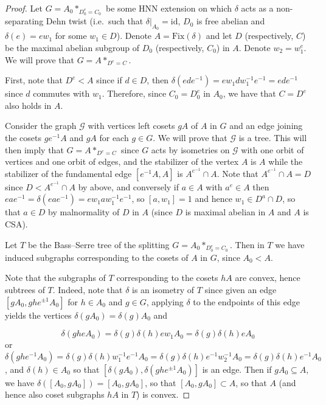 \documentclass{amsart}
\theoremstyle{plain}
\theoremstyle{definition}
\theoremstyle{remark}
\begin{document}
\begin{proof}
    Let $G = {A_0}*_{D_0^e=C_0}$ be some HNN extension on which $\delta$ acts as a non-separating Dehn twist (i.e.\ such that $\delta\vert_{A_0} = \mathrm{id}$, $D_0$ is free abelian and $\delta(e) = ew_1$ for some $w_1 \in D$). Denote $A = \mathrm{Fix}(\delta)$ and let $D$ (respectively, $C$) be the maximal abelian subgroup of $D_0$ (respectively, $C_0$) in $A$. Denote $w_2 = w_1^e$. We will prove that $G = A*_{D^e=C}$.

    First, note that $D^e < A$ since if $d \in D$, then $\delta(ede^{-1}) = ew_1 d w_1^{-1}e^{-1} = ede^{-1}$ since $d$ commutes with $w_1$. Therefore, since $C_0 = D_0^e$ in $A_0$, we have that $C = D^e$ also holds in $A$. 

    Consider the graph $\mathcal{G}$ with vertices left cosets $gA$ of $A$ in $G$ and an edge joining the cosets $ge^{-1}A$ and $gA$ for each $g \in G$. We will prove that $\mathcal{G}$ is a tree. This will then imply that $G = A*_{D^e=C}$ since $G$ acts by isometries on $\mathcal{G}$ with one orbit of vertices and one orbit of edges, and the stabilizer of the vertex $A$ is $A$ while the stabilizer of the fundamental edge $[e^{-1}A, A]$ is $A^{e^{-1}} \cap A$. Note that $A^{e^{-1}} \cap A = D$ since $D < A^{e^{-1}} \cap A$ by above, and conversely if $a \in A$ with $a^e \in A$ then $ eae^{-1}=\delta(eae^{-1}) = ew_1 a w_1^{-1}e^{-1} $, so $[a,w_1]=1$ and hence $w_1 \in D^a \cap D$, so that $a \in D$ by malnormality of $D$ in $A$ (since $D$ is maximal abelian in $A$ and $A$ is CSA). 

    Let $T$ be the Bass--Serre tree of the splitting $G = {A_0}*_{D_0^e=C_0}$. Then in $T$ we have induced subgraphs corresponding to the cosets of $A$ in $G$, since $A_0 < A$. 
    
    Note that the subgraphs of $T$ corresponding to the cosets $hA$ are convex, hence subtrees of $T$. Indeed, note that $\delta$ is an isometry of $T$ since given an edge $[gA_0, ghe^{\pm 1}A_0]$ for $h \in A_0$ and $g \in G$, applying $\delta$ to the endpoints of this edge yields the vertices $\delta(gA_0) = \delta(g)A_0$ and 

    $$\delta(gheA_0) = \delta(g) \delta(h) ew_1 A_0=\delta(g) \delta(h) e A_0$$ or $$\delta(ghe^{-1}A_0) = \delta(g) \delta(h) w_1^{-1}e^{-1} A_0=\delta(g) \delta(h) e^{-1}w_2^{-1} A_0=\delta(g) \delta(h) e^{-1} A_0$$, and $\delta(h) \in A_0$ so that $[\delta(gA_0), \delta(ghe^{\pm1}A_0)]$ is an edge. Then if $gA_0 \subseteq A$, we have $\delta([A_0, gA_0]) = [A_0, gA_0]$, so that $[A_0, gA_0] \subset A$, so that $A$ (and hence also coset subgraphs $hA$ in $T$) is convex. 
    

\end{proof}
\end{document}
